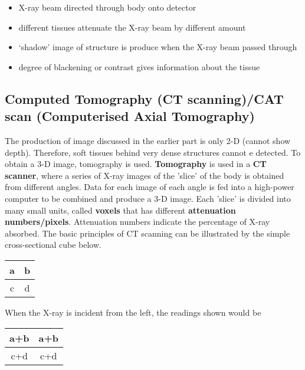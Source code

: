 \documentclass{article}
\begin{document}
\begin{tcolorbox}[colframe=black!20!white,title=\color{red}{****Explain the principles of X-ray imaging. (4m)}]
\begin{itemize}
\color{red}
        \item X-ray beam directed through body onto detector 
        \item different tissues attenuate the X-ray beam by different amount
        \item `shadow' image of structure is produce when the X-ray beam passed through 
        \item degree of blackening or contrast gives information about the tissue
\end{itemize}
\end{tcolorbox}


\subsection{Computed Tomography (CT scanning)/CAT scan (Computerised Axial Tomography)}

The production of image discussed in the earlier part is only 2-D (cannot show depth). Therefore, soft tissues behind very dense structures cannot e detected. To obtain a 3-D image, tomography is used. \textbf{Tomography} is used in a \textbf{CT scanner}, where a series of X-ray images of the 'slice' of the body is obtained from different angles. Data for each image of each angle is fed into a high-power computer to be combined and produce a 3-D image. 
Each 'slice' is divided into many small units, called \textbf{voxels} that has different \textbf{attenuation numbers/pixels}. Attenuation numbers indicate the percentage of X-ray absorbed.
The basic principles of CT scanning can be illustrated by the simple cross-sectional cube below.

\begin{center}
    \begin{tabular}{|c|c|}
    \hline
    a    &  b\\
    \hline
    c    & d\\
    \hline
    \end{tabular}
\end{center}

When the X-ray is incident from the left, the readings shown would be 
\begin{center}
    \begin{tabular}{|c|c|}
    \hline
    a+b & a+b\\
    \hline
    c+d & c+d\\
    \hline
    \end{tabular}
\end{center}
\end{document}
